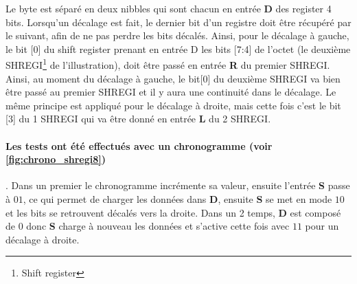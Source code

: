 \documentclass[a4paper]{article} %
\begin{document}
\begin{tcolorbox}[colframe=Monokaimagenta,colback=white]
Le byte est séparé en deux nibbles qui sont chacun en entrée \textbf{D} des register 4 bits.
Lorsqu'un décalage est fait, le dernier bit d'un registre doit être récupéré par le suivant, afin de ne pas perdre les bits décalés. Ainsi, pour le décalage à gauche, le bit [0] du shift register prenant en entrée D les bits [7:4] de l'octet (le deuxième SHREGI\footnote{Shift register} de l'illustration), doit être passé en entrée \textbf{R} du premier SHREGI. Ainsi, au moment du décalage à gauche, le bit[0] du deuxième SHREGI va bien être passé au premier SHREGI et il y aura une continuité dans le décalage.
Le même principe est appliqué pour le décalage à droite, mais cette fois c'est le bit [3] du 1 SHREGI qui va être donné en entrée \textbf{L} du 2 SHREGI.

\paragraph{Les tests ont été effectués avec un chronogramme (voir \ref{fig:chrono_shregi8}) }. Dans un premier le chronogramme incrémente sa valeur, ensuite l'entrée \textbf{S} passe à $01$, ce qui permet de charger les données dans \textbf{D}, ensuite \textbf{S} se met en mode $10$ et les bits se retrouvent décalés vers la droite. Dans un 2 temps, \textbf{D} est composé de $0$ donc \textbf{S} charge à nouveau les données et s'active cette fois avec $11$ pour un décalage à droite.
  
\end{tcolorbox}
\end{document}
